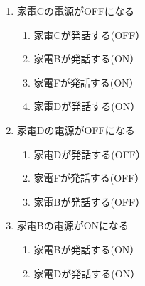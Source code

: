 \documentclass[a4j,12pt,twoside]{jreport}
\begin{document}
\begin{multicols}{2}
\begin{enumerate}
		\item 家電Cの電源がOFFになる
		\begin{enumerate}	
			\item 家電Cが発話する(OFF）
			\item 家電Bが発話する(ON）
			\item 家電Fが発話する(ON）
			\item 家電Dが発話する(ON）
		\end{enumerate}
		\item 家電Dの電源がOFFになる
		\begin{enumerate}
			\item 家電Dが発話する(OFF）
			\item 家電Fが発話する(OFF）
			\item 家電Bが発話する(OFF）
		\end{enumerate}
		
		\item 家電Bの電源がONになる
		\begin{enumerate}
			\item 家電Bが発話する(ON）
			\item 家電Dが発話する(ON）
		\end{enumerate}
	\end{enumerate}
\end{multicols}
\newpage
\end{document}
